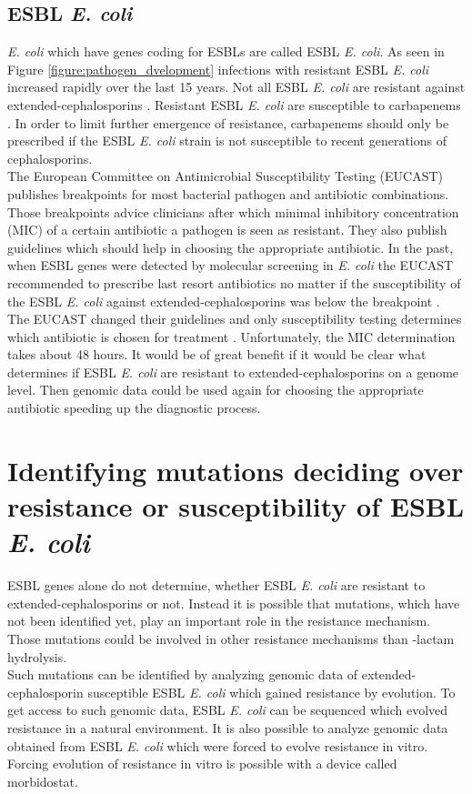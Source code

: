 \subsection{ESBL \textit{E. coli}}
\textit{E. coli} which have genes coding for ESBLs are called ESBL \textit{E. coli}. As seen in Figure \ref{figure:pathogen_dvelopment} infections with resistant ESBL \textit{E. coli} increased rapidly over the last 15 years. Not all ESBL \textit{E. coli} are resistant against extended-cephalosporins \cite{mcwilliams_incidence_2014}. Resistant ESBL \textit{E. coli} are susceptible to carbapenems \cite{fernandes_-lactams:_2013}. In order to limit further emergence of resistance, carbapenems should only be prescribed if the ESBL \textit{E. coli} strain is not susceptible to recent generations of cephalosporins. \\
The European Committee on Antimicrobial Susceptibility Testing (EUCAST) publishes breakpoints for most bacterial pathogen and antibiotic combinations. Those breakpoints advice clinicians after which minimal inhibitory concentration (MIC) of a certain antibiotic a pathogen is seen as resistant. They also publish guidelines which should help in choosing the appropriate antibiotic. 
In the past, when ESBL genes were detected by molecular screening in \textit{E. coli} the EUCAST recommended to prescribe last resort antibiotics no matter if the susceptibility of the ESBL \textit{E. coli} against extended-cephalosporins was below the breakpoint \cite{leclercq_eucast_2013}. The EUCAST changed their guidelines and only susceptibility testing determines which antibiotic is chosen for treatment \cite{leclercq_eucast_2013}. Unfortunately, the MIC determination takes about 48 hours. It would be of great benefit if it would be clear what determines if ESBL \textit{E. coli} are resistant to extended-cephalosporins on a genome level. Then genomic data could be used again for choosing the appropriate antibiotic speeding up the diagnostic process. \\ 

\section{Identifying mutations deciding over resistance or susceptibility of ESBL \textit{E. coli}}
ESBL genes alone do not determine, whether ESBL \textit{E. coli} are resistant to extended-cephalosporins or not. Instead it is possible that mutations, which have not been identified yet, play an important role in the resistance mechanism. Those mutations could be involved in other resistance mechanisms than \textbeta-lactam hydrolysis. \\
Such mutations can be identified by analyzing genomic data of extended-cephalosporin susceptible ESBL \textit{E. coli} which gained resistance by evolution. To get access to such genomic data, ESBL \textit{E. coli} can be sequenced which evolved resistance in a natural environment. It is also possible to analyze genomic data obtained from ESBL \textit{E. coli} which were forced to evolve resistance in vitro. Forcing evolution of resistance in vitro is possible with a device called morbidostat.

